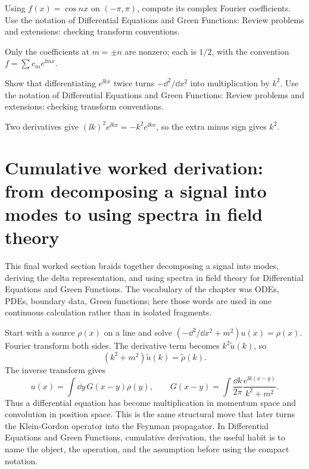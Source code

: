 \begin{exercise}
Using \(f(x)=\cos nx\) on \((-\pi,\pi)\), compute its complex Fourier coefficients.  Use the notation of Differential Equations and Green Functions: Review problems and extensions: checking transform conventions.
\begin{answer}
Only the coefficients at \(m=\pm n\) are nonzero; each is \(1/2\), with the convention \(f=\sum c_me^{\ii mx}\).
\end{answer}
\end{exercise}

\begin{exercise}
Show that differentiating \(e^{\ii kx}\) twice turns \(-\dd^2/\dd x^2\) into multiplication by \(k^2\).  Use the notation of Differential Equations and Green Functions: Review problems and extensions: checking transform conventions.
\begin{answer}
Two derivatives give \((\ii k)^2e^{\ii kx}=-k^2e^{\ii kx}\), so the extra minus sign gives \(k^2\).
\end{answer}
\end{exercise}



\section{Cumulative worked derivation: from decomposing a signal into modes to using spectra in field theory}

This final worked section braids together decomposing a signal into modes, deriving the delta representation, and using spectra in field theory for Differential Equations and Green Functions.  The vocabulary of the chapter was ODEs, PDEs, boundary data, Green functions; here those words are used in one continuous calculation rather than in isolated fragments.

Start with a source \(\rho(x)\) on a line and solve \((-\dd^2/\dd x^2+m^2)u(x)=\rho(x)\).  Fourier transform both sides.  The derivative term becomes \(k^2\tilde u(k)\), so
\[
  (k^2+m^2)\tilde u(k)=\tilde\rho(k).
\]
The inverse transform gives
\[
  u(x)=\int\dd y\,G(x-y)\rho(y),
  \qquad
  G(x-y)=\int\frac{\dd k}{2\pi}\frac{e^{\ii k(x-y)}}{k^2+m^2}.
\]
Thus a differential equation has become multiplication in momentum space and convolution in position space.  This is the same structural move that later turns the Klein-Gordon operator into the Feynman propagator.  In Differential Equations and Green Functions, cumulative derivation, the useful habit is to name the object, the operation, and the assumption before using the compact notation.

